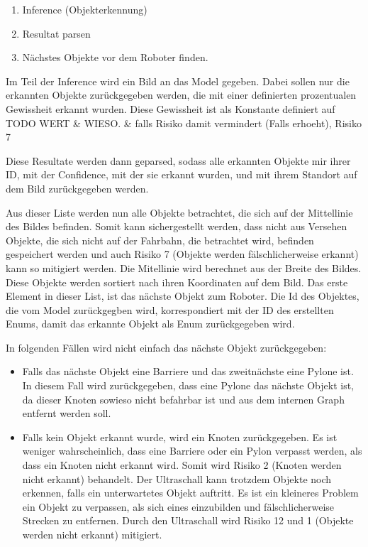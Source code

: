 \begin{enumerate}
    \item Inference (Objekterkennung)
    \item Resultat parsen
    \item Nächstes Objekte vor dem Roboter finden.
\end{enumerate}

Im Teil der Inference wird ein Bild an das Model gegeben. Dabei sollen nur die erkannten Objekte zurückgegeben werden, die mit einer definierten prozentualen Gewissheit erkannt wurden. Diese Gewissheit ist als Konstante definiert auf TODO WERT \& WIESO. \& falls Risiko damit vermindert (Falls erhoeht), Risiko 7

Diese Resultate werden dann geparsed, sodass alle erkannten Objekte mir ihrer ID, mit der Confidence, mit der sie erkannt wurden, und mit ihrem Standort auf dem Bild zurückgegeben werden.

Aus dieser Liste werden nun alle Objekte betrachtet, die sich auf der Mittellinie des Bildes befinden. Somit kann sichergestellt werden, dass nicht aus Versehen Objekte, die sich nicht auf der Fahrbahn, die betrachtet wird, befinden gespeichert werden und auch Risiko 7 (Objekte werden fälschlicherweise erkannt) kann so mitigiert werden. Die Mitellinie wird berechnet aus der Breite des Bildes. Diese Objekte werden sortiert nach ihren Koordinaten auf dem Bild. Das erste Element in dieser List, ist das nächste Objekt zum Roboter. Die Id des Objektes, die vom Model zurückgegben wird, korrespondiert mit der ID des erstellten Enums, damit das erkannte Objekt als Enum zurückgegeben wird.

In folgenden Fällen wird nicht einfach das nächste Objekt zurückgegeben:

\begin{itemize}
    \item Falls das nächste Objekt eine Barriere und das zweitnächste eine Pylone ist. In diesem Fall wird zurückgegeben, dass eine Pylone das nächste Objekt ist, da dieser Knoten sowieso nicht befahrbar ist und aus dem internen Graph entfernt werden soll.
    \item Falls kein Objekt erkannt wurde, wird ein Knoten zurückgegeben. Es ist weniger wahrscheinlich, dass eine Barriere oder ein Pylon verpasst werden, als dass ein Knoten nicht erkannt wird. Somit wird Risiko 2 (Knoten werden nicht erkannt) behandelt. Der Ultraschall kann trotzdem Objekte noch erkennen, falls ein unterwartetes Objekt auftritt. Es ist ein kleineres Problem ein Objekt zu verpassen, als sich eines einzubilden und fälschlicherweise Strecken zu entfernen. Durch den Ultraschall wird Risiko 12 und 1 (Objekte werden nicht erkannt) mitigiert.
\end{itemize}


